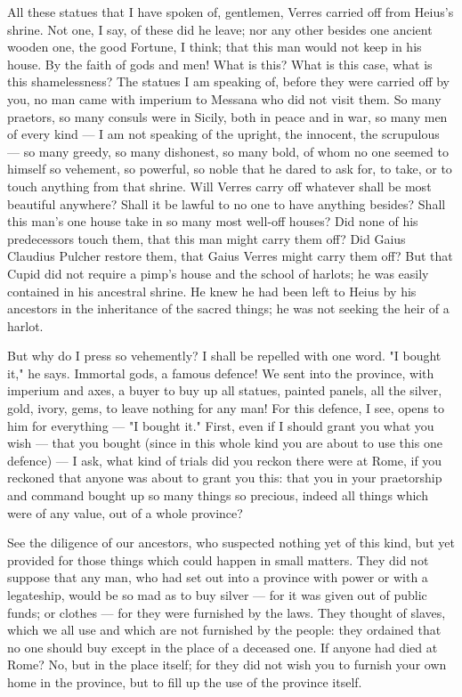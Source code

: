  All these statues that I have spoken of, gentlemen, Verres carried off from Heius's shrine. Not one, I say, of these did he leave; nor any other besides one ancient wooden one, the good Fortune, I think; that this man would not keep in his house. By the faith of gods and men! What is this? What is this case, what is this shamelessness? The statues I am speaking of, before they were carried off by you, no man came with imperium to Messana who did not visit them. So many praetors, so many consuls were in Sicily, both in peace and in war, so many men of every kind --- I am not speaking of the upright, the innocent, the scrupulous --- so many greedy, so many dishonest, so many bold, of whom no one seemed to himself so vehement, so powerful, so noble that he dared to ask for, to take, or to touch anything from that shrine. Will Verres carry off whatever shall be most beautiful anywhere? Shall it be lawful to no one to have anything besides? Shall this man's one house take in so many most well-off houses? Did none of his predecessors touch them, that this man might carry them off? Did Gaius Claudius Pulcher restore them, that Gaius Verres might carry them off? But that Cupid did not require a pimp's house and the school of harlots; he was easily contained in his ancestral shrine. He knew he had been left to Heius by his ancestors in the inheritance of the sacred things; he was not seeking the heir of a harlot.

 But why do I press so vehemently? I shall be repelled with one word. "I bought it," he says. Immortal gods, a famous defence! We sent into the province, with imperium and axes, a buyer to buy up all statues, painted panels, all the silver, gold, ivory, gems, to leave nothing for any man! For this defence, I see, opens to him for everything --- "I bought it." First, even if I should grant you what you wish --- that you bought (since in this whole kind you are about to use this one defence) --- I ask, what kind of trials did you reckon there were at Rome, if you reckoned that anyone was about to grant you this: that you in your praetorship and command bought up so many things so precious, indeed all things which were of any value, out of a whole province?

 See the diligence of our ancestors, who suspected nothing yet of this kind, but yet provided for those things which could happen in small matters. They did not suppose that any man, who had set out into a province with power or with a legateship, would be so mad as to buy silver --- for it was given out of public funds; or clothes --- for they were furnished by the laws. They thought of slaves, which we all use and which are not furnished by the people: they ordained that no one should buy except in the place of a deceased one. If anyone had died at Rome? No, but in the place itself; for they did not wish you to furnish your own home in the province, but to fill up the use of the province itself.

